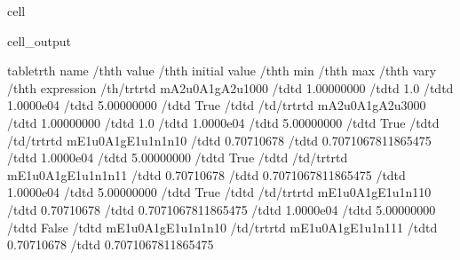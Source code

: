 \documentclass[letterpaper,table,10pt,english]{jupyterBook}
\begin{document}
\begin{sphinxuseclass}{cell}
\begin{sphinxVerbatimOutput}
\begin{sphinxuseclass}{cell_output}
\begin{sphinxVerbatim}[commandchars=\\\{\}]
\PYGZsq{}\PYGZlt{}table\PYGZgt{}\PYGZlt{}tr\PYGZgt{}\PYGZlt{}th\PYGZgt{} name \PYGZlt{}/th\PYGZgt{}\PYGZlt{}th\PYGZgt{} value \PYGZlt{}/th\PYGZgt{}\PYGZlt{}th\PYGZgt{} initial value \PYGZlt{}/th\PYGZgt{}\PYGZlt{}th\PYGZgt{} min \PYGZlt{}/th\PYGZgt{}\PYGZlt{}th\PYGZgt{} max \PYGZlt{}/th\PYGZgt{}\PYGZlt{}th\PYGZgt{} vary \PYGZlt{}/th\PYGZgt{}\PYGZlt{}th\PYGZgt{} expression \PYGZlt{}/th\PYGZgt{}\PYGZlt{}/tr\PYGZgt{}\PYGZlt{}tr\PYGZgt{}\PYGZlt{}td\PYGZgt{} m\PYGZus{}A2u\PYGZus{}0\PYGZus{}A1g\PYGZus{}A2u\PYGZus{}1\PYGZus{}0\PYGZus{}0\PYGZus{}0 \PYGZlt{}/td\PYGZgt{}\PYGZlt{}td\PYGZgt{}  1.00000000 \PYGZlt{}/td\PYGZgt{}\PYGZlt{}td\PYGZgt{} 1.0 \PYGZlt{}/td\PYGZgt{}\PYGZlt{}td\PYGZgt{}  1.0000e\PYGZhy{}04 \PYGZlt{}/td\PYGZgt{}\PYGZlt{}td\PYGZgt{}  5.00000000 \PYGZlt{}/td\PYGZgt{}\PYGZlt{}td\PYGZgt{} True \PYGZlt{}/td\PYGZgt{}\PYGZlt{}td\PYGZgt{}  \PYGZlt{}/td\PYGZgt{}\PYGZlt{}/tr\PYGZgt{}\PYGZlt{}tr\PYGZgt{}\PYGZlt{}td\PYGZgt{} m\PYGZus{}A2u\PYGZus{}0\PYGZus{}A1g\PYGZus{}A2u\PYGZus{}3\PYGZus{}0\PYGZus{}0\PYGZus{}0 \PYGZlt{}/td\PYGZgt{}\PYGZlt{}td\PYGZgt{}  1.00000000 \PYGZlt{}/td\PYGZgt{}\PYGZlt{}td\PYGZgt{} 1.0 \PYGZlt{}/td\PYGZgt{}\PYGZlt{}td\PYGZgt{}  1.0000e\PYGZhy{}04 \PYGZlt{}/td\PYGZgt{}\PYGZlt{}td\PYGZgt{}  5.00000000 \PYGZlt{}/td\PYGZgt{}\PYGZlt{}td\PYGZgt{} True \PYGZlt{}/td\PYGZgt{}\PYGZlt{}td\PYGZgt{}  \PYGZlt{}/td\PYGZgt{}\PYGZlt{}/tr\PYGZgt{}\PYGZlt{}tr\PYGZgt{}\PYGZlt{}td\PYGZgt{} m\PYGZus{}E1u\PYGZus{}0\PYGZus{}A1g\PYGZus{}E1u\PYGZus{}1\PYGZus{}n1\PYGZus{}n1\PYGZus{}0 \PYGZlt{}/td\PYGZgt{}\PYGZlt{}td\PYGZgt{}  0.70710678 \PYGZlt{}/td\PYGZgt{}\PYGZlt{}td\PYGZgt{} 0.7071067811865475 \PYGZlt{}/td\PYGZgt{}\PYGZlt{}td\PYGZgt{}  1.0000e\PYGZhy{}04 \PYGZlt{}/td\PYGZgt{}\PYGZlt{}td\PYGZgt{}  5.00000000 \PYGZlt{}/td\PYGZgt{}\PYGZlt{}td\PYGZgt{} True \PYGZlt{}/td\PYGZgt{}\PYGZlt{}td\PYGZgt{}  \PYGZlt{}/td\PYGZgt{}\PYGZlt{}/tr\PYGZgt{}\PYGZlt{}tr\PYGZgt{}\PYGZlt{}td\PYGZgt{} m\PYGZus{}E1u\PYGZus{}0\PYGZus{}A1g\PYGZus{}E1u\PYGZus{}1\PYGZus{}n1\PYGZus{}n1\PYGZus{}1 \PYGZlt{}/td\PYGZgt{}\PYGZlt{}td\PYGZgt{}  0.70710678 \PYGZlt{}/td\PYGZgt{}\PYGZlt{}td\PYGZgt{} 0.7071067811865475 \PYGZlt{}/td\PYGZgt{}\PYGZlt{}td\PYGZgt{}  1.0000e\PYGZhy{}04 \PYGZlt{}/td\PYGZgt{}\PYGZlt{}td\PYGZgt{}  5.00000000 \PYGZlt{}/td\PYGZgt{}\PYGZlt{}td\PYGZgt{} True \PYGZlt{}/td\PYGZgt{}\PYGZlt{}td\PYGZgt{}  \PYGZlt{}/td\PYGZgt{}\PYGZlt{}/tr\PYGZgt{}\PYGZlt{}tr\PYGZgt{}\PYGZlt{}td\PYGZgt{} m\PYGZus{}E1u\PYGZus{}0\PYGZus{}A1g\PYGZus{}E1u\PYGZus{}1\PYGZus{}n1\PYGZus{}1\PYGZus{}0 \PYGZlt{}/td\PYGZgt{}\PYGZlt{}td\PYGZgt{}  0.70710678 \PYGZlt{}/td\PYGZgt{}\PYGZlt{}td\PYGZgt{} 0.7071067811865475 \PYGZlt{}/td\PYGZgt{}\PYGZlt{}td\PYGZgt{}  1.0000e\PYGZhy{}04 \PYGZlt{}/td\PYGZgt{}\PYGZlt{}td\PYGZgt{}  5.00000000 \PYGZlt{}/td\PYGZgt{}\PYGZlt{}td\PYGZgt{} False \PYGZlt{}/td\PYGZgt{}\PYGZlt{}td\PYGZgt{} m\PYGZus{}E1u\PYGZus{}0\PYGZus{}A1g\PYGZus{}E1u\PYGZus{}1\PYGZus{}n1\PYGZus{}n1\PYGZus{}0 \PYGZlt{}/td\PYGZgt{}\PYGZlt{}/tr\PYGZgt{}\PYGZlt{}tr\PYGZgt{}\PYGZlt{}td\PYGZgt{} m\PYGZus{}E1u\PYGZus{}0\PYGZus{}A1g\PYGZus{}E1u\PYGZus{}1\PYGZus{}n1\PYGZus{}1\PYGZus{}1 \PYGZlt{}/td\PYGZgt{}\PYGZlt{}td\PYGZgt{}  0.70710678 \PYGZlt{}/td\PYGZgt{}\PYGZlt{}td\PYGZgt{} 0.7071067811865475 
\end{sphinxVerbatim}
\end{sphinxuseclass}
\end{sphinxVerbatimOutput}
\end{sphinxuseclass}
\end{document}

